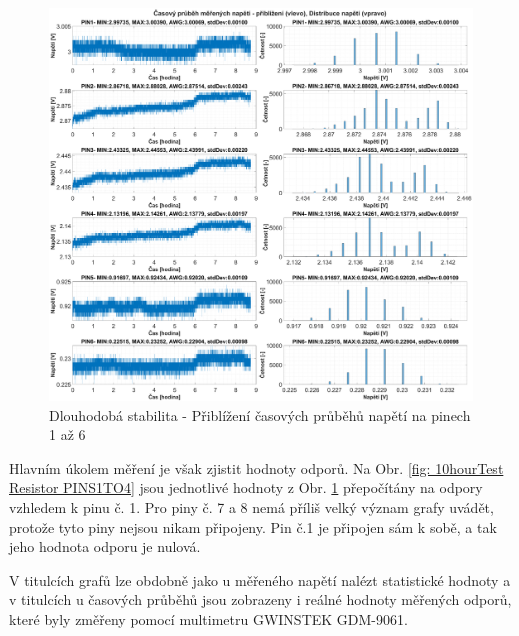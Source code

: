 \begin{figure}[ht!]
    \centering
    \includegraphics[width = 1\textwidth]{obrazky/matlab_generated/VOLTAGE_TESTER/dlouhodoba_stabilita_voltage_part1.eps}
    \caption{Dlouhodobá stabilita - Přiblížení časových průběhů napětí na pinech 1 až 6}
    \label{fig: 10hourTest Voltage PINS1TO4}
\end{figure}

Hlavním úkolem měření je však zjistit hodnoty odporů. Na Obr. \ref{fig: 10hourTest Resistor PINS1TO4}
jsou jednotlivé hodnoty z Obr. \ref{fig: 10hourTest Voltage PINS1TO4} přepočítány na odpory vzhledem k pinu č. 1.
Pro piny č. 7 a 8 nemá příliš velký význam grafy uvádět, protože tyto piny nejsou nikam připojeny. Pin č.1 je připojen sám k sobě,
a tak jeho hodnota odporu je nulová.\par
V titulcích grafů lze obdobně jako u měřeného napětí nalézt statistické hodnoty a 
v titulcích u časových průběhů jsou zobrazeny i reálné hodnoty měřených odporů, které byly změřeny pomocí multimetru
GWINSTEK GDM-9061.\par

